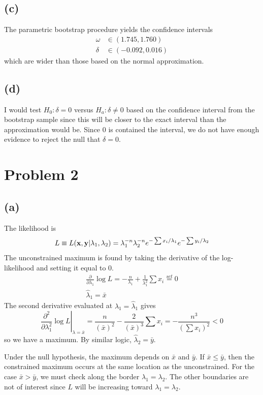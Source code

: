 \documentclass[12pt]{article}
\begin{document}
\subsection*{(c)}

\noindent The parametric bootstrap procedure yields the confidence intervals
\begin{align*}
\omega &\in (1.745, 1.760) \\
\delta &\in (-0.092, 0.016) 
\end{align*}
\noindent which are wider than those based on the normal approximation.

\subsection*{(d)}

\noindent I would test $H_0:\delta=0$ versus $H_a:\delta\neq 0$ based on the confidence interval from the bootstrap sample since this will be closer to the exact interval than the approximation would be. Since 0 is contained the interval, we do not have enough evidence to reject the null that $\delta=0$. 
 
\section*{Problem 2}

\subsection*{(a)}

\noindent The likelihood is
\[ L\equiv L(\mathbf{\bm{x}},\mathbf{\bm{y}}|\lambda_1,\lambda_2) = \lambda_1^{-n}\lambda_2^{-n}e^{-\sum x_i / \lambda_1}e^{-\sum y_i / \lambda_2} \]
\noindent The unconstrained maximum is found by taking the derivative of the log-likelihood and setting it equal to 0.
\begin{align*}
\frac{\partial}{\partial \lambda_1} \log L = -\frac{n}{\lambda_1} + \frac{1}{\lambda_1^2}\sum x_i \overset{set}= 0 \\
\hat\lambda_1 = \bar x
\end{align*}
\noindent The second derivative evaluated at $\lambda_1=\hat\lambda_1$ gives
\[ \left.\frac{\partial^2}{\partial \lambda_1^2} \log L \right\vert_{\lambda=\bar x} = \frac{n}{(\bar x)^2} - \frac{2}{(\bar x)^3}\sum x_i = -\frac{n^3}{(\sum x_i)^2} < 0\]
\noindent so we have a maximum. By similar logic, $\hat\lambda_2 = \bar y$.
\bigskip

\noindent Under the null hypothesis, the maximum depends on $\bar x$ and $\bar y$. If $\bar x \leq \bar y$, then the constrained maximum occurs at the same location as the unconstrained. For the case $\bar x > \bar y$, we must check along the border $\lambda_1=\lambda_2$. The other boundaries are not of interest since $L$ will be increasing toward $\lambda_1=\lambda_2$.
\bigskip
\end{document}
